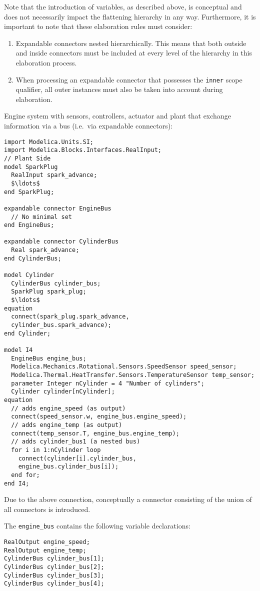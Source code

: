 \begin{nonnormative}
Note that the introduction of variables, as described above, is conceptual and does not necessarily impact the flattening hierarchy in any way.
Furthermore, it is important to note that these elaboration rules must consider:
\begin{enumerate}
\item
  Expandable connectors nested hierarchically.
  This means that  both outside and inside connectors must be included at every level of the hierarchy in this elaboration process.
\item
  When processing an expandable connector that possesses the \lstinline!inner! scope qualifier, all outer instances must also be taken into account during elaboration.
\end{enumerate}
\end{nonnormative}

\begin{example}
Engine system with sensors, controllers, actuator and plant that exchange information via a bus (i.e.\ via expandable connectors):
\begin{lstlisting}[language=modelica]
import Modelica.Units.SI;
import Modelica.Blocks.Interfaces.RealInput;
// Plant Side
model SparkPlug
  RealInput spark_advance;
  $\ldots$
end SparkPlug;

expandable connector EngineBus
  // No minimal set
end EngineBus;

expandable connector CylinderBus
  Real spark_advance;
end CylinderBus;

model Cylinder
  CylinderBus cylinder_bus;
  SparkPlug spark_plug;
  $\ldots$
equation
  connect(spark_plug.spark_advance,
  cylinder_bus.spark_advance);
end Cylinder;

model I4
  EngineBus engine_bus;
  Modelica.Mechanics.Rotational.Sensors.SpeedSensor speed_sensor;
  Modelica.Thermal.HeatTransfer.Sensors.TemperatureSensor temp_sensor;
  parameter Integer nCylinder = 4 "Number of cylinders";
  Cylinder cylinder[nCylinder];
equation
  // adds engine_speed (as output)
  connect(speed_sensor.w, engine_bus.engine_speed);
  // adds engine_temp (as output)
  connect(temp_sensor.T, engine_bus.engine_temp);
  // adds cylinder_bus1 (a nested bus)
  for i in 1:nCylinder loop
    connect(cylinder[i].cylinder_bus,
    engine_bus.cylinder_bus[i]);
  end for;
end I4;
\end{lstlisting}
Due to the above connection, conceptually a connector consisting of the union of all connectors is introduced.

The \lstinline!engine_bus! contains the following variable declarations:
\begin{lstlisting}[language=modelica]
RealOutput engine_speed;
RealOutput engine_temp;
CylinderBus cylinder_bus[1];
CylinderBus cylinder_bus[2];
CylinderBus cylinder_bus[3];
CylinderBus cylinder_bus[4];
\end{lstlisting}
\end{example}

